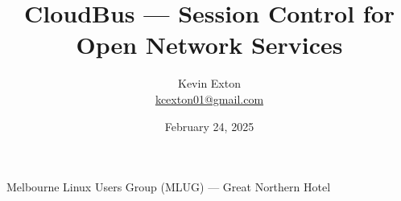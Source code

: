 \title{CloudBus --- Session Control for Open Network Services}
\author[K. Exton]{
	\centering
	Kevin Exton\\
	\href{mailto:kcexton01@gmail.com}{\footnotesize kcexton01@gmail.com}
}
\date{February 24, 2025}
\begin{frame}[plain]
	\titlepage
	\centering
	\footnotesize Melbourne Linux Users Group (MLUG) --- Great Northern Hotel
\end{frame}